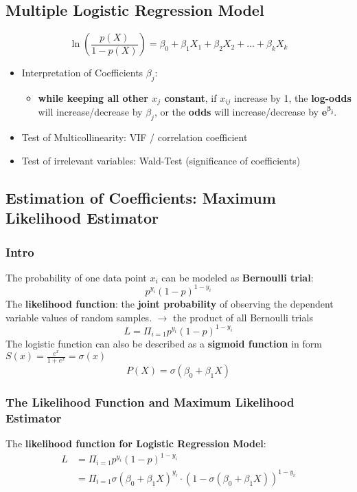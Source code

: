 \subsection{Multiple Logistic Regression Model}
$$\ln(\frac{p(X)}{1 - p(X)}) = \beta_0 + \beta_1 X_1 + \beta_2 X_2 + \dots + \beta_k X_k$$
\begin{itemize}
	\item Interpretation of Coefficients $\beta_j$: 
	\begin{itemize}
		\item \textbf{while keeping all other $x_j$ constant}, if $x_{ij}$ increase by 1, the \textbf{log-odds} will increase/decrease by $\beta_j$, or the \textbf{odds} will increase/decrease by $\mathbf{e^{\beta_j}}$.
	\end{itemize}
	\item Test of Multicollinearity: VIF / correlation coefficient
	\item Test of irrelevant variables: Wald-Test (significance of coefficients) 
\end{itemize}

\subsection{Estimation of Coefficients: Maximum Likelihood Estimator}
\subsubsection{Intro}
The probability of one data point $x_i$ can be modeled as \textbf{Bernoulli trial}: 
$$p^{y_i}(1-p)^{1-y_i}$$
The \textbf{likelihood function}:  the \textbf{joint probability} of observing the dependent variable values of random samples. $\rightarrow$ the product of all Bernoulli trials
$$L = \Pi_{i=1} p^{y_i}(1-p)^{1-y_i}$$
The logistic function can also be described as a \textbf{sigmoid function} in form $S(x) = \frac{e^x}{1 + e^x} = \sigma(x)$
$$P(X) = \sigma(\beta_0 + \beta_1 X)$$
\subsubsection{The Likelihood Function and Maximum Likelihood Estimator}
The \textbf{likelihood function for Logistic Regression Model}:
\begin{align*}
	L &= \Pi_{i=1} p^{y_i}(1-p)^{1-y_i} \\
	  &= \Pi_{i=1} \sigma(\beta_0 + \beta_1 X)^{y_i} \cdot (1 - \sigma(\beta_0 + \beta_1 X))^{1-y_i}
\end{align*}

